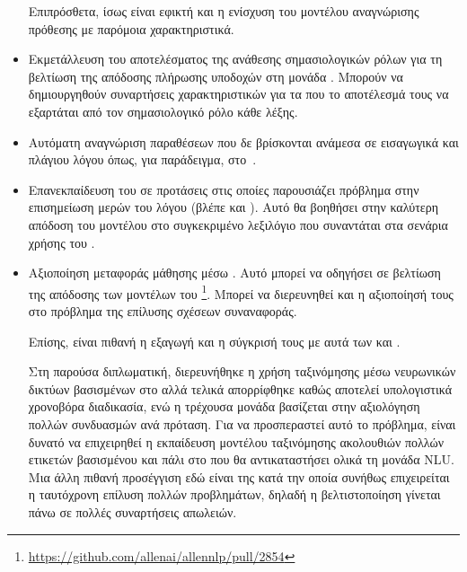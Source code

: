 \begin{itemize}
          Επιπρόσθετα, ίσως είναι εφικτή και η ενίσχυση του μοντέλου αναγνώρισης πρόθεσης με παρόμοια χαρακτηριστικά.
    \item Εκμετάλλευση του αποτελέσματος της ανάθεσης σημασιολογικών ρόλων για τη βελτίωση της απόδοσης πλήρωσης υποδοχών στη μονάδα \NLU{}.
          Μπορούν να δημιουργηθούν συναρτήσεις χαρακτηριστικών για τα \CRFR{} που το αποτέλεσμά τους να εξαρτάται από τον σημασιολογικό ρόλο κάθε λέξης.
    \item Αυτόματη αναγνώριση παραθέσεων που δε βρίσκονται ανάμεσα σε εισαγωγικά και πλάγιου λόγου όπως, για παράδειγμα, στο~\cite{pareti2013automatically}.
    \item Επανεκπαίδευση του  σε προτάσεις στις οποίες παρουσιάζει πρόβλημα στην επισημείωση μερών του λόγου (βλέπε και ).
          Αυτό θα βοηθήσει στην καλύτερη απόδοση του μοντέλου στο συγκεκριμένο λεξιλόγιο που συναντάται στα σενάρια χρήσης του \projectname{}.
    \item Αξιοποίηση μεταφοράς μάθησης μέσω .
          Αυτό μπορεί να οδηγήσει σε βελτίωση της απόδοσης των μοντέλων του \footnote{\url{https://github.com/allenai/allennlp/pull/2854}}.
          Μπορεί να διερευνηθεί και η αξιοποίησή τους στο πρόβλημα της επίλυσης σχέσεων συναναφοράς.

          Επίσης, είναι πιθανή η εξαγωγή  και η σύγκρισή τους με αυτά των  και .

          Στη παρούσα διπλωματική, διερευνήθηκε η χρήση ταξινόμησης μέσω νευρωνικών δικτύων βασισμένων στο  αλλά τελικά απορρίφθηκε καθώς αποτελεί υπολογιστικά χρονοβόρα διαδικασία,
          ενώ η τρέχουσα μονάδα \NLU{} βασίζεται στην αξιολόγηση πολλών συνδυασμών ανά πρόταση.
          Για να προσπεραστεί αυτό το πρόβλημα, είναι δυνατό να επιχειρηθεί η εκπαίδευση μοντέλου ταξινόμησης ακολουθιών πολλών ετικετών βασισμένου και πάλι στο  που θα αντικαταστήσει ολικά τη μονάδα NLU.
          Μια άλλη πιθανή προσέγγιση εδώ είναι της  κατά την οποία συνήθως επιχειρείται η ταυτόχρονη επίλυση πολλών προβλημάτων,
          δηλαδή η βελτιστοποίηση γίνεται πάνω σε πολλές συναρτήσεις απωλειών.
\end{itemize}

